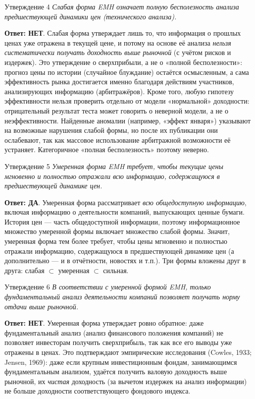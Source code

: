 \documentclass[10pt,a4paper]{article}
\newcommand{\qda}{\textbf{\color{yesgreen}Ответ: ДА}}
\newcommand{\qnet}{\textbf{\color{nored}Ответ: НЕТ}}
\newenvironment{answer}[2]{%
  \begin{qbox}{Утверждение #1}
  \textit{#2}\par\smallskip
}{%
  \end{qbox}\vspace{2pt}
}
\begin{document}
\begin{answer}{4}{Слабая форма EMH означает полную бесполезность анализа предшествующей динамики цен (технического анализа).}
\qnet. Слабая форма утверждает лишь то, что информация о прошлых ценах уже отражена в текущей цене, и потому на основе её анализа \emph{нельзя систематически получать доходность выше рыночной} (с учётом рисков и издержек). Это утверждение о сверхприбыли, а не о «полной бесполезности»: прогноз цены по истории (случайное блуждание) остаётся осмысленным, а сама эффективность рынка достигается именно благодаря действиям участников, анализирующих информацию (арбитражёров). Кроме того, любую гипотезу эффективности нельзя проверить отдельно от модели «нормальной» доходности: отрицательный результат теста может говорить о неверной модели, а не о неэффективности. Найденные аномалии (например, «эффект января») указывают на возможные нарушения слабой формы, но после их публикации они ослабевают, так как массовое использование арбитражной возможности её устраняет. Категоричное «полная бесполезность» поэтому неверно.
\end{answer}

\begin{answer}{5}{Умеренная форма EMH требует, чтобы текущие цены мгновенно и полностью отражали всю информацию, содержащуюся в предшествующей динамике цен.}
\qda. Умеренная форма рассматривает \emph{всю общедоступную информацию}, включая информацию о деятельности компаний, выпускающих ценные бумаги. История цен --- часть общедоступной информации, поэтому информационное множество умеренной формы включает множество слабой формы. Значит, умеренная форма тем более требует, чтобы цены мгновенно и полностью отражали информацию, содержащуюся в предшествующей динамике цен (а дополнительно --- и в отчётности, новостях и т.п.). Три формы вложены друг в друга: слабая $\subset$ умеренная $\subset$ сильная.
\end{answer}

\begin{answer}{6}{В соответствии с умеренной формой EMH, только фундаментальный анализ деятельности компаний позволяет получать норму отдачи выше рыночной.}
\qnet. Умеренная форма утверждает ровно обратное: даже фундаментальный анализ (анализ финансового положения компаний) не позволяет инвесторам получить сверхприбыль, так как все его выводы уже отражены в ценах. Это подтверждают эмпирические исследования (Cowles, 1933; Jensen, 1969): даже если крупным инвестиционным фондам, занимающимся фундаментальным анализом, удаётся получить валовую доходность выше рыночной, их \emph{чистая} доходность (за вычетом издержек на анализ информации) не больше доходности соответствующего фондового индекса.
\end{answer}
\end{document}
